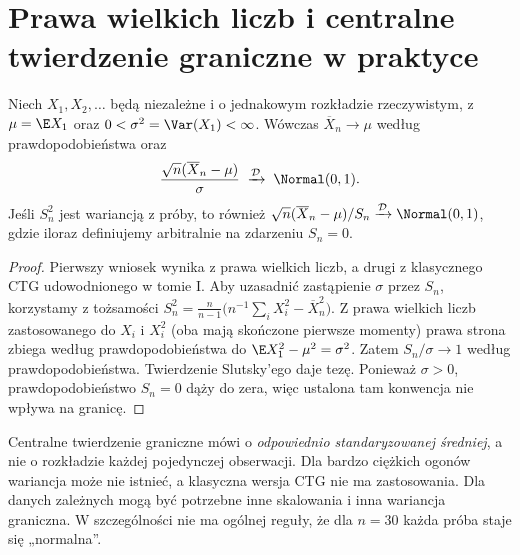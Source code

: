 \section{Prawa wielkich liczb i centralne twierdzenie graniczne w praktyce}
\begin{twierdzenie}\label{thm:clt-review}
Niech $X_1,X_2,\ldots$ będą niezależne i o jednakowym rozkładzie rzeczywistym, z $\mu=\E X_1$ oraz $0<\sigma^2=\Var(X_1)<\infty$. Wówczas $\overline X_n\to\mu$ według prawdopodobieństwa oraz
\[
\frac{\sqrt n(\overline X_n-\mu)}{\sigma}\;\xrightarrow{\mathcal D}\;\Normal(0,1).
\]
Jeśli $S_n^2$ jest wariancją z próby, to również
$\sqrt n(\overline X_n-\mu)/S_n\xrightarrow{\mathcal D}\Normal(0,1)$, gdzie iloraz definiujemy arbitralnie na zdarzeniu $S_n=0$.
\end{twierdzenie}
\begin{proof}
Pierwszy wniosek wynika z prawa wielkich liczb, a drugi z klasycznego CTG udowodnionego w tomie I. Aby uzasadnić zastąpienie $\sigma$ przez $S_n$, korzystamy z tożsamości
$S_n^2=\tfrac n{n-1}\bigl(n^{-1}\sum_iX_i^2-\overline X_n^2\bigr)$. Z prawa wielkich liczb zastosowanego do $X_i$ i $X_i^2$ (oba mają skończone pierwsze momenty) prawa strona zbiega według prawdopodobieństwa do $\E X_1^2-\mu^2=\sigma^2$. Zatem $S_n/\sigma\to1$ według prawdopodobieństwa. Twierdzenie Slutsky'ego daje tezę. Ponieważ $\sigma>0$, prawdopodobieństwo $S_n=0$ dąży do zera, więc ustalona tam konwencja nie wpływa na granicę.
\end{proof}

\begin{uwaga}
Centralne twierdzenie graniczne mówi o \emph{odpowiednio standaryzowanej średniej}, a nie o rozkładzie każdej pojedynczej obserwacji. Dla bardzo ciężkich ogonów wariancja może nie istnieć, a klasyczna wersja CTG nie ma zastosowania. Dla danych zależnych mogą być potrzebne inne skalowania i inna wariancja graniczna. W szczególności nie ma ogólnej reguły, że dla $n=30$ każda próba staje się „normalna”.
\end{uwaga}

